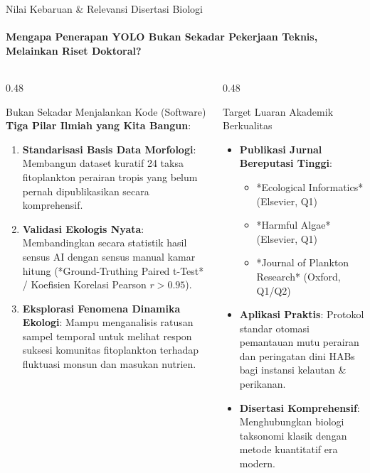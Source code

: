 \documentclass[aspectratio=169, 10pt]{beamer}
\begin{document}
\begin{frame}{Nilai Kebaruan \& Relevansi Disertasi Biologi}
    \framesubtitle{Mengapa Penerapan YOLO Bukan Sekadar Pekerjaan Teknis, Melainkan Riset Doktoral?}
    
    \begin{columns}[T]
        \begin{column}{0.48\textwidth}
            \begin{biocard}{Bukan Sekadar Menjalankan Kode (Software)}
                \scriptsize
                \textbf{Tiga Pilar Ilmiah yang Kita Bangun}:
                \begin{enumerate}\setlength\itemsep{3pt}
                    \item \textbf{Standarisasi Basis Data Morfologi}: Membangun dataset kuratif 24 taksa fitoplankton perairan tropis yang belum pernah dipublikasikan secara komprehensif.
                    \item \textbf{Validasi Ekologis Nyata}: Membandingkan secara statistik hasil sensus AI dengan sensus manual kamar hitung (*Ground-Truthing Paired t-Test* / Koefisien Korelasi Pearson $r > 0.95$).
                    \item \textbf{Eksplorasi Fenomena Dinamika Ekologi}: Mampu menganalisis ratusan sampel temporal untuk melihat respon suksesi komunitas fitoplankton terhadap fluktuasi monsun dan masukan nutrien.
                \end{enumerate}
            \end{biocard}
        \end{column}
        
        \begin{column}{0.48\textwidth}
            \begin{conceptcard}{Target Luaran Akademik Berkualitas}
                \scriptsize
                \begin{itemize}\setlength\itemsep{4pt}
                    \item \textbf{Publikasi Jurnal Bereputasi Tinggi}:
                        \begin{itemize}\scriptsize
                            \item *Ecological Informatics* (Elsevier, Q1)
                            \item *Harmful Algae* (Elsevier, Q1)
                            \item *Journal of Plankton Research* (Oxford, Q1/Q2)
                        \end{itemize}
                    \item \textbf{Aplikasi Praktis}: Protokol standar otomasi pemantauan mutu perairan dan peringatan dini HABs bagi instansi kelautan \& perikanan.
                    \item \textbf{Disertasi Komprehensif}: Menghubungkan biologi taksonomi klasik dengan metode kuantitatif era modern.
                \end{itemize}
            \end{conceptcard}
        \end{column}
    \end{columns}
\end{frame}
\end{document}
